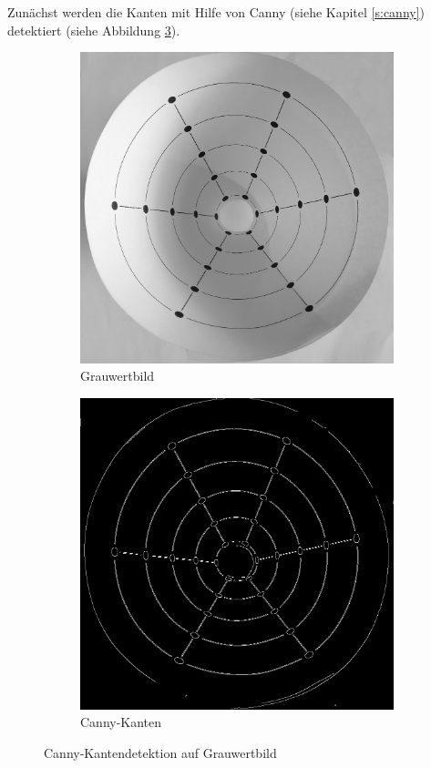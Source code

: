 Zunächst werden die Kanten mit Hilfe von Canny (siehe Kapitel \ref{s:canny}) detektiert (siehe Abbildung \ref{fig:canny}). 

\begin{figure}[!htb]
	\centering
	\begin{subfigure}{.5\textwidth}
		\centering
		\includegraphics[width=.9\textwidth]{images/grey.png}
		\caption{Grauwertbild}
		\label{fig:beforeCanny}
	\end{subfigure}%
	\begin{subfigure}{.5\textwidth}
		\centering
		\includegraphics[width=.9\textwidth]{images/canny.png}
		\caption{Canny-Kanten}
		\label{fig:afterCanny}
	\end{subfigure}
	\caption{Canny-Kantendetektion auf Grauwertbild}
	\label{fig:canny}
\end{figure}

